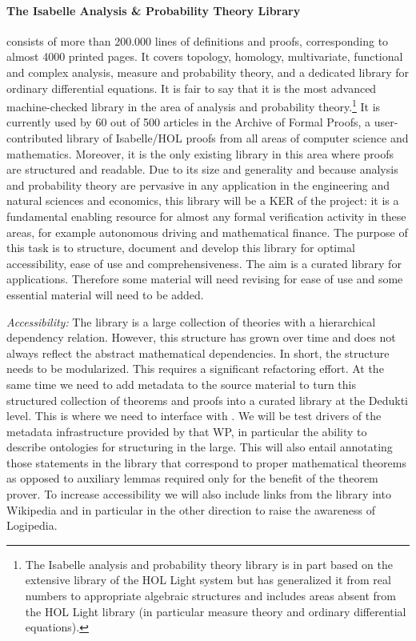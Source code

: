 \paragraph*{The Isabelle Analysis \& Probability Theory Library} consists of more than
200.000 lines of definitions and proofs, corresponding to almost 4000 printed
pages. It covers topology, homology, multivariate, functional and complex
analysis, measure and probability theory, and a dedicated library for
ordinary differential equations. It is fair to say that it is the most
advanced machine-checked library in the area of analysis and probability
theory.\footnote{The Isabelle analysis and probability theory library is
in part based on the extensive library of the HOL Light system but has
generalized it from real numbers to appropriate algebraic structures and
includes areas absent from the HOL Light library (in particular measure
theory and ordinary differential equations).} It is currently used by 60 out
of 500 articles in the Archive of Formal Proofs, a user-contributed library
of Isabelle/HOL proofs from all areas of computer science and
mathematics. Moreover, it is the only existing library in this area where
proofs are structured and readable. Due to its size and generality and
because analysis and probability theory are pervasive in any application in
the engineering and natural sciences and economics, this library will be a
KER of the project: it is a fundamental enabling resource for almost any
formal verification activity in these areas, for example autonomous driving
and mathematical finance. The purpose of this task is to structure, document
and develop this library for optimal accessibility, ease of use and
comprehensiveness. The aim is a curated library for applications.
Therefore some material will need revising for ease
of use and some essential material will need to be added.

\emph{Accessibility:}
The library is a large collection of theories with a hierarchical dependency
relation. However, this structure has grown over time and does not always
reflect the abstract mathematical dependencies. In short, the structure needs
to be modularized. This requires a significant refactoring effort.
%
At the same time we need to add metadata to the source material to turn this
structured collection of theorems and proofs into a curated library at the
Dedukti level.  This is where we need to interface with . We
will be test drivers of the metadata infrastructure provided by that WP, in
particular the ability to describe ontologies for structuring in the large.
This will also entail annotating those statements in the library that
correspond to proper mathematical theorems as opposed to auxiliary lemmas
required only for the benefit of the theorem prover.
To increase accessibility we will also include links from the library into
Wikipedia and in particular in the other direction to raise the awareness
of Logipedia.

